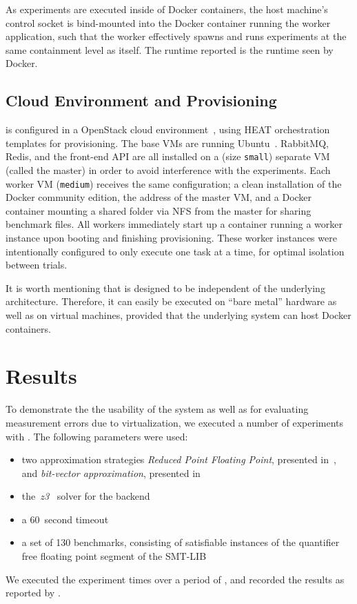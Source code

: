 \documentclass[a4paper]{IEEEtran}
\begin{document}
As experiments are executed inside of Docker containers, the host machine's
control socket is bind-mounted into the Docker container running the worker
application, such that the worker effectively spawns and runs experiments at the
same containment level as itself. The runtime reported is the runtime seen by
Docker.

\subsection{Cloud Environment and Provisioning}

\testbench{} is configured in a OpenStack cloud environment~\cite{openstack},
using HEAT orchestration templates for provisioning. The base VMs are running
Ubuntu~. RabbitMQ, Redis, and the front-end API are all installed
on a (size \texttt{small}) separate VM (called the master) in order to avoid
interference with the experiments. Each worker VM (\texttt{medium}) receives the
same configuration; a clean installation of the Docker community edition, the
address of the master VM, and a Docker container mounting a shared folder via
NFS from the master for sharing benchmark files. All workers immediately start
up a container running a worker instance upon booting and finishing
provisioning. These worker instances were intentionally configured to only
execute one task at a time, for optimal isolation between trials.

It is worth mentioning that \testbench{} is designed to be independent of the
underlying architecture. Therefore, it can easily be executed on ``bare metal''
hardware as well as on virtual machines, provided that the underlying system can
host Docker containers.

\section{Results}
To demonstrate the the usability of the system as well as for evaluating
measurement errors due to virtualization, we executed a number of experiments
with \testbench{}. The following parameters were used:
\begin{itemize}
\item two approximation strategies \emph{Reduced Point
  Floating Point}, presented in~\cite{uppsat}, and \emph{bit-vector
  approximation}, presented in~\cite{joel}

\item the~\emph{z3}~\cite{z3} solver for the backend

\item a 60~second timeout

\item a set of 130 benchmarks, consisting of satisfiable instances of the
  quantifier free floating point segment of the SMT-LIB~\cite{smtlib}
\end{itemize}
We executed the experiment  times over a period of
, and recorded the results as reported by \testbench{}.
\end{document}
